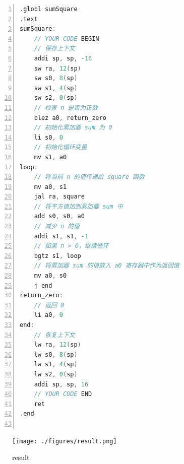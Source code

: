 \documentclass[cn,12pt]{homework}
\begin{document}
\begin{solution}
  \quad

  \begin{lstlisting}[language=C, caption=Code for Problem 2, label=code:example, frame=single, numbers=left, numberstyle=\tiny, breaklines=true, backgroundcolor=\color{lightgray}]
.globl sumSquare
.text
sumSquare:
    // YOUR CODE BEGIN
    // 保存上下文
    addi sp, sp, -16
    sw ra, 12(sp)
    sw s0, 8(sp)
    sw s1, 4(sp)
    sw s2, 0(sp)
    // 检查 n 是否为正数
    blez a0, return_zero
    // 初始化累加器 sum 为 0
    li s0, 0
    // 初始化循环变量
    mv s1, a0
loop:
    // 将当前 n 的值传递给 square 函数
    mv a0, s1
    jal ra, square
    // 将平方值加到累加器 sum 中
    add s0, s0, a0
    // 减少 n 的值
    addi s1, s1, -1
    // 如果 n > 0，继续循环
    bgtz s1, loop
    // 将累加器 sum 的值放入 a0 寄存器中作为返回值
    mv a0, s0
    j end
return_zero:
    // 返回 0
    li a0, 0
end:
    // 恢复上下文
    lw ra, 12(sp)
    lw s0, 8(sp)
    lw s1, 4(sp)
    lw s2, 0(sp)
    addi sp, sp, 16
    // YOUR CODE END
    ret
.end


  \end{lstlisting}

\begin{figure}[h!]
  \centering
  \texttt{[image: ./figures/result.png]}
  \caption{result}
  \label{fig:pro1}
\end{figure}


\end{solution}



\end{document}
